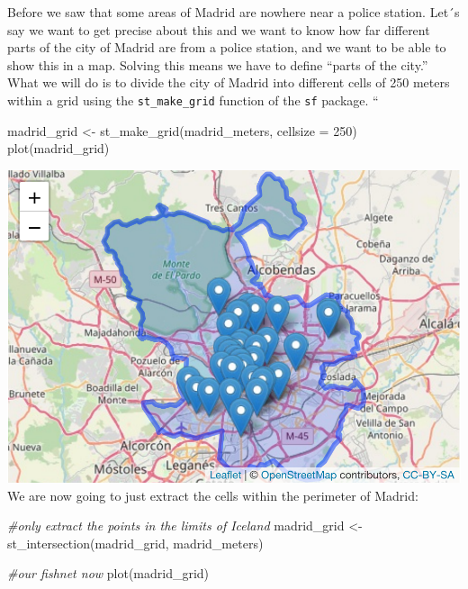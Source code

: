 \documentclass[
]{book}
\newenvironment{Shaded}{\begin{snugshade}}{\end{snugshade}}
\newcommand{\AttributeTok}[1]{\textcolor[rgb]{0.77,0.63,0.00}{#1}}
\newcommand{\CommentTok}[1]{\textcolor[rgb]{0.56,0.35,0.01}{\textit{#1}}}
\newcommand{\DecValTok}[1]{\textcolor[rgb]{0.00,0.00,0.81}{#1}}
\newcommand{\FunctionTok}[1]{\textcolor[rgb]{0.00,0.00,0.00}{#1}}
\newcommand{\NormalTok}[1]{#1}
\newcommand{\OtherTok}[1]{\textcolor[rgb]{0.56,0.35,0.01}{#1}}
\begin{document}
Before we saw that some areas of Madrid are nowhere near a police station. Let´s say we want to get precise about this and we want to know how far different parts of the city of Madrid are from a police station, and we want to be able to show this in a map. Solving this means we have to define ``parts of the city.'' What we will do is to divide the city of Madrid into different cells of 250 meters within a grid using the \texttt{st\_make\_grid} function of the \texttt{sf} package.
``

\begin{Shaded}
\begin{Highlighting}[]
\NormalTok{madrid\_grid }\OtherTok{\textless{}{-}} \FunctionTok{st\_make\_grid}\NormalTok{(madrid\_meters,  }\AttributeTok{cellsize =} \DecValTok{250}\NormalTok{)}
\FunctionTok{plot}\NormalTok{(madrid\_grid)}
\end{Highlighting}
\end{Shaded}

\includegraphics{crime_mapping_files/figure-latex/unnamed-chunk-60-1.pdf}
We are now going to just extract the cells within the perimeter of Madrid:

\begin{Shaded}
\begin{Highlighting}[]
\CommentTok{\#only extract the points in the limits of Iceland}
\NormalTok{madrid\_grid }\OtherTok{\textless{}{-}} \FunctionTok{st\_intersection}\NormalTok{(madrid\_grid, madrid\_meters)   }

\CommentTok{\#our fishnet now}
\FunctionTok{plot}\NormalTok{(madrid\_grid)}
\end{Highlighting}
\end{Shaded}
\end{document}
